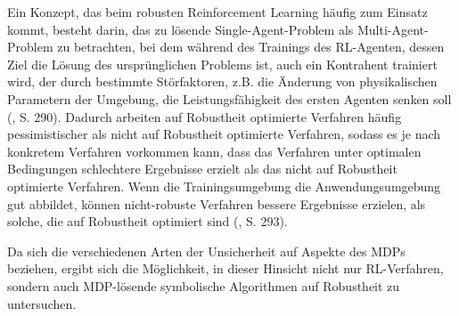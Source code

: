 Ein Konzept, das beim robusten Reinforcement Learning häufig zum Einsatz kommt, besteht darin, das zu lösende Single-Agent-Problem als Multi-Agent-Problem zu betrachten, bei dem während des Trainings des RL-Agenten, dessen Ziel die Lösung des ursprünglichen Problems ist, auch ein Kontrahent trainiert wird, der durch bestimmte Störfaktoren, z.B. die Änderung von physikalischen Parametern der Umgebung, die Leistungsfähigkeit des ersten Agenten senken soll (\cite{Moos.2022}, S. 290). Dadurch arbeiten auf Robustheit optimierte Verfahren häufig pessimistischer als nicht auf Robustheit optimierte Verfahren, sodass es je nach konkretem Verfahren vorkommen kann, dass das Verfahren unter optimalen Bedingungen schlechtere Ergebnisse erzielt als das nicht auf Robustheit optimierte Verfahren. Wenn die Trainingsumgebung die Anwendungsumgebung gut abbildet, können nicht-robuste Verfahren bessere Ergebnisse erzielen, als solche, die auf Robustheit optimiert sind (\cite{Moos.2022}, S. 293).

Da sich die verschiedenen Arten der Unsicherheit auf Aspekte des MDPs beziehen, ergibt sich die Möglichkeit, in dieser Hinsicht nicht nur RL-Verfahren, sondern auch MDP-lösende symbolische Algorithmen auf Robustheit zu untersuchen.
